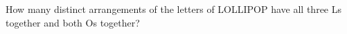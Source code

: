 How many distinct arrangements of the letters of LOLLIPOP have all three Ls together and both Os together?
